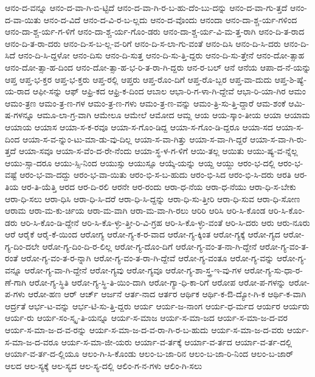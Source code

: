 {ಆನಂ-ದ-ವನ್ನೂ
ಆನಂ-ದ-ವಾ-ಗಿ-ಬಿ-ಟ್ಟಿದೆ
ಆನಂ-ದ-ವಾ-ಗಿ-ರ-ಬ-ಹು-ದೆಂ-ಬು-ದನ್ನು
ಆನಂ-ದ-ವಾ-ಗು-ತ್ತದೆ
ಆನಂ-ದ-ವಾ-ಯಿತು
ಆನಂ-ದ-ವಿದೆ
ಆನಂ-ದ-ವಿ-ರ-ಬ-ಲ್ಲದು
ಆನಂ-ದ-ವೊಂದು
ಆನಂದಾ
ಆನಂ-ದಾ-ಶ್ಚ-ರ್ಯ-ಗಳಿಂದ
ಆನಂ-ದಾ-ಶ್ಚ-ರ್ಯ-ಗ-ಳಿಗೆ
ಆನಂ-ದಾ-ಶ್ಚ-ರ್ಯ-ಗೊಂ-ಡರು
ಆನಂ-ದಾ-ಶ್ಚ-ರ್ಯ-ವಿ-ಮ-ತ್ತ-ರಾಗಿ
ಆನಂ-ದಿ-ತ-ರಾದ
ಆನಂ-ದಿ-ತ-ರಾ-ದರು
ಆನಂ-ದಿ-ಸ-ಬ-ಲ್ಲ-ವ-ರಿಗೆ
ಆನಂ-ದಿ-ಸ-ಲಾ-ಗು-ವಂತೆ
ಆನಂ-ದಿಸಿ
ಆನಂ-ದಿ-ಸಿ-ದರು
ಆನಂ-ದಿ-ಸಿದೆ
ಆನಂ-ದಿ-ಸಿ-ದ್ದಳೋ
ಆನಂ-ದಿಸು
ಆನಂ-ದಿ-ಸುತ್ತ
ಆನಂ-ದಿ-ಸು-ತ್ತಿ-ದ್ದರು
ಆನಂ-ದಿ-ಸು-ತ್ತೇನೆ
ಆನಂ-ದೋ-ತ್ಸಾಹ
ಆನಂ-ದೋ-ತ್ಸಾ-ಹ-ದಿಂದ
ಆನಂ-ದೋ-ತ್ಸಾ-ಹ-ಭ-ರಿ-ತ-ರಾ-ಗಿ-ದ್ದರು
ಆನ-ರ-ಬಲ್
ಆನೆ
ಆನೆಯ
ಆಪಾ-ದ-ನೆ-ಯನ್ನು
ಆಪ್ತ
ಆಪ್ತ-ಭ-ಕ್ತರ
ಆಪ್ತ-ಭ-ಕ್ತರು
ಆಪ್ತ-ರಲ್ಲಿ
ಆಪ್ತರು
ಆಪ್ತ-ರೊಂ-ದಿಗೆ
ಆಪ್ತ-ರೊ-ಬ್ಬರ
ಆಪ್ತ-ವಾ-ದುದು
ಆಪ್ತ-ಶಿ-ಷ್ಯೆ-ಯ-ರಾದ
ಆಫೀ-ಸನ್ನು
ಆಫ್
ಆಫ್ರಿ-ಕದ
ಆಫ್ರಿ-ಕ-ದಿಂದ
ಆಬಾಲ
ಆಭಾ-ರಿ-ಗ-ಳಾ-ಗಿ-ದ್ದೇವೆ
ಆಭಾ-ರಿ-ಯಾ-ಗಿರ
ಆಮಂ
ಆಮಂ-ತ್ರಣ
ಆಮಂ-ತ್ರ-ಣ-ಗಳ
ಆಮಂ-ತ್ರ-ಣ-ಗಳು
ಆಮಂ-ತ್ರ-ಣ-ವನ್ನು
ಆಮಂ-ತ್ರಿ-ಸು-ತ್ತಿ-ದ್ದಾರೆ
ಆಮ-ಶಂಕೆ
ಆಮಿ-ಷ-ಗಳನ್ನೂ
ಆಮೂ-ಲಾ-ಗ್ರ-ವಾಗಿ
ಆಮೇಲೂ
ಆಮೇಲೆ
ಆಮೋದ
ಆಮ್ಲ
ಆಯ
ಆಯ-ಸ್ಕಾಂ-ತೀಯ
ಆಯಾ
ಆಯಾಮ
ಆಯಾಯ
ಆಯಾಸ
ಆಯಾ-ಸ-ಕ-ರವೂ
ಆಯಾ-ಸ-ಗೊಂ-ಡಿದ್ದ
ಆಯಾ-ಸ-ಗೊಂ-ಡಿ-ದ್ದರೂ
ಆಯಾ-ಸದ
ಆಯಾ-ಸ-ದಿಂದ
ಆಯಾ-ಸ-ವ-ನ್ನುಂ-ಟು-ಮಾ-ಡು-ವು-ದಿಲ್ಲ
ಆಯಾ-ಸ-ವಾ-ಗಿತ್ತು
ಆಯಾ-ಸ-ವಾ-ಗಿ-ದ್ದರೆ
ಆಯಾ-ಸ-ವಾ-ಗಿ-ರು-ತ್ತದೆ
ಆಯಾ-ಸವೂ
ಆಯಾ-ಸ-ವೆಂ-ದ-ರೇ-ನೆಂದು
ಆಯಾ-ಸ್ಥ-ಳ-ಗ-ಳಿಗೆ
ಆಯಿ-ತಲ್ಲ
ಆಯಿತು
ಆಯು-ಷ್ಯ-ವ-ನ್ನೆಲ್ಲ
ಆಯು-ಸ್ಸಾ-ದರೂ
ಆಯು-ಸ್ಸಿ-ನಿಂದ
ಆಯುಸ್ಸು
ಆಯುಸ್ಸೂ
ಆಯ್ಕೆ-ಯನ್ನು
ಆಯ್ದ
ಆಯ್ದು
ಆರಂ-ಭ-ದಲ್ಲಿ
ಆರಂ-ಭ-ವಷ್ಟೆ
ಆರಂ-ಭ-ವಾ-ದದ್ದು
ಆರಂ-ಭ-ವಾ-ಯಿತು
ಆರಂ-ಭಿ-ಸ-ಬ-ಹುದು
ಆರಂ-ಭಿ-ಸಿದ
ಆರಂ-ಭಿ-ಸಿ-ದರು
ಆರತಿ
ಆರ-ತಿಯ
ಆರ-ತಿ-ಯೆತ್ತಿ
ಆರದ
ಆರ-ದಿ-ರಲಿ
ಆರನೇ
ಆರ-ರಂದು
ಆರಾ-ಧ-ನೆಯ
ಆರಾ-ಧ-ನೆಯು
ಆರಾ-ಧಿ-ಸ-ಬೇಕು
ಆರಾ-ಧಿ-ಸಲು
ಆರಾ-ಧಿಸಿ
ಆರಾ-ಧಿ-ಸಿ-ದರೆ
ಆರಾ-ಧಿ-ಸಿ-ದ್ದನ್ನು
ಆರಾ-ಧಿ-ಸು-ತ್ತೀರಿ
ಆರಾ-ಧಿ-ಸುವ
ಆರಾ-ಧಿ-ಸೋಣ
ಆರಾಮ
ಆರಾ-ಮ-ಕು-ರ್ಚಿಯ
ಆರಾ-ಮ-ವಾಗಿ
ಆರಾ-ಮ-ವಾ-ಗಿ-ರಲು
ಆರಿರಿ
ಆರಿಸಿ
ಆರಿ-ಸಿ-ಕೊಂಡ
ಆರಿ-ಸಿ-ಕೊಂ-ಡರು
ಆರಿ-ಸಿ-ಕೊಂ-ಡಿ-ದ್ದೇನೆ
ಆರಿ-ಸಿ-ಕೊ-ಳ್ಳು-ತ್ತೀ-ರಿ-ವಿ-ಗ್ರಹ
ಆರಿ-ಸಿ-ಕೊ-ಳ್ಳು-ವಂತೆ
ಆರಿ-ಸಿ-ದರು
ಆರು
ಆರು-ನೂರು
ಆರೆ
ಆರೈಕೆ
ಆರೈ-ಕೆ-ಯಿಂದ
ಆರೋಗ್ಯ
ಆರೋ-ಗ್ಯ-ಕ-ರ-ವಾದ
ಆರೋ-ಗ್ಯ-ಕ್ಕಿಂತ
ಆರೋ-ಗ್ಯಕ್ಕೆ
ಆರೋ-ಗ್ಯದ
ಆರೋ-ಗ್ಯ-ದಿಂ-ದಲೇ
ಆರೋ-ಗ್ಯ-ದಿಂ-ದಿ-ರ-ಲಿಲ್ಲ
ಆರೋ-ಗ್ಯ-ದೊಂ-ದಿಗೆ
ಆರೋ-ಗ್ಯ-ವಂ-ತ-ನಾ-ಗಿ-ದ್ದೇನೆ
ಆರೋ-ಗ್ಯ-ವಂ-ತ-ರಂತೆ
ಆರೋ-ಗ್ಯ-ವಂ-ತ-ರ-ನ್ನಾಗಿ
ಆರೋ-ಗ್ಯ-ವಂ-ತ-ರಾ-ಗಿ-ದ್ದೇವೆ
ಆರೋ-ಗ್ಯ-ವಂತೂ
ಆರೋ-ಗ್ಯ-ವನ್ನು
ಆರೋ-ಗ್ಯ-ವನ್ನೂ
ಆರೋ-ಗ್ಯ-ವಾ-ಗಿ-ದ್ದೇನೆ
ಆರೋ-ಗ್ಯವು
ಆರೋ-ಗ್ಯವೂ
ಆರೋ-ಗ್ಯ-ಶಾ-ಸ್ತ್ರ-ಇ-ವು-ಗಳ
ಆರೋ-ಗ್ಯ-ಸು-ಧಾ-ರ-ಣೆ-ಗಾಗಿ
ಆರೋ-ಗ್ಯ-ಸ್ಥಿತಿ
ಆರೋ-ಗ್ಯ-ಸ್ಥಿ-ತಿ-ಯಿಂ-ದಾಗಿ
ಆರೋ-ಗ್ಯಾ-ಧಿ-ಕಾ-ರಿಗೆ
ಆರೋಪ
ಆರೋ-ಪ-ಗಳನ್ನು
ಆರೋ-ಪ-ಗಳು
ಆರೋ-ಹಣ
ಆರ್
ಆರ್ಚ್
ಆರ್ಜನೆ
ಆರ್ತ-ನಾದ
ಆರ್ತರ
ಆರ್ಥಿಕ
ಆರ್ಥಿ-ಕ-ಔ-ದ್ಯೋ-ಗಿ-ಕ
ಆರ್ಥಿ-ಕ-ವಾಗಿ
ಆರ್ದ್ರತೆ
ಆರ್ಭ-ಟ-ವನ್ನು
ಆರ್ಭ-ಟಿ-ಸು-ತ್ತಿ-ದ್ದರು
ಆರ್ಯ
ಆರ್ಯ-ಜ-ನಾಂಗ
ಆರ್ಯ-ಧ-ರ್ಮದ
ಆರ್ಯರ
ಆರ್ಯರು
ಆರ್ಯ-ರು
ಆರ್ಯ-ಸಂ-ಸ್ಕೃ-ತಿ-ಯನ್ನೂ
ಆರ್ಯ-ಸ-ಮಾಜ
ಆರ್ಯ-ಸ-ಮಾ-ಜದ
ಆರ್ಯ-ಸ-ಮಾ-ಜ-ದ-ವರ
ಆರ್ಯ-ಸ-ಮಾ-ಜ-ದ-ವ-ರನ್ನು
ಆರ್ಯ-ಸ-ಮಾ-ಜ-ದ-ವ-ರಾ-ಗಿ-ರ-ಬ-ಹುದು
ಆರ್ಯ-ಸ-ಮಾ-ಜ-ದ-ವರು
ಆರ್ಯ-ಸ-ಮಾ-ಜ-ದ-ವರೂ
ಆರ್ಯ-ಸ-ಮಾ-ಜೀ-ಯರು
ಆರ್ಯಾ-ವ-ರ್ತಕ್ಕೆ
ಆರ್ಯಾ-ವ-ರ್ತದ
ಆರ್ಯಾ-ವ-ರ್ತ-ದಲ್ಲಿ
ಆರ್ಯಾ-ವ-ರ್ತ-ದ-ಲ್ಲಿಯೂ
ಆಲಂ-ಗಿ-ಸಿ-ಕೊಂಡು
ಆಲಂ-ಬ-ಜಾ-ರಿನ
ಆಲಂ-ಬ-ಜಾ-ರಿ-ನಿಂದ
ಆಲಂ-ಬ-ಜಾರ್
ಆಲದ
ಆಲ-ಸ್ಯಕ್ಕೆ
ಆಲ-ಸ್ಯದ
ಆಲ-ಸ್ಯ-ದಲ್ಲಿ
ಆಲಿಂ-ಗ-ನ-ಗಳು
ಆಲಿಂ-ಗಿ-ಸಲು
}
